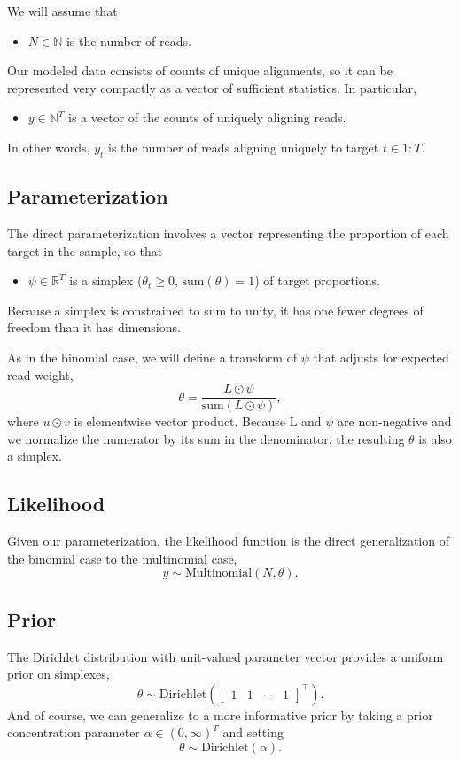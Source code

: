 \documentclass[11pt]{report}
\newcommand{\rngto}[1]{1{:}#1}
\begin{document}
We will assume that
%
\begin{itemize}
\item  $N \in \mathbb{N}$ is the number of reads.
\end{itemize}
%
Our modeled data consists of counts of unique alignments, so it can be
represented very compactly as a vector of sufficient statistics.  In
particular,
%
\begin{itemize}
\item $y \in \mathbb{N}^T$ is a vector of the counts of uniquely
  aligning reads.
\end{itemize}
%
In other words, $y_t$ is the number of reads aligning uniquely to
target $t \in \rngto{T}$.

\subsection{Parameterization}

The direct parameterization involves a vector representing the
proportion of each target in the sample, so that
%
\begin{itemize}
\item $\psi \in \mathbb{R}^T$ is a simplex ($\theta_t \geq 0$,
  $\textrm{sum}(\theta) = 1$) of target proportions.
\end{itemize}
%
Because a simplex is constrained to sum to unity, it has one fewer
degrees of freedom than it has dimensions.

As in the binomial case, we will define a transform of $\psi$ that
adjusts for expected read weight,
\[
  \theta = \frac{L \odot \psi}{\textrm{sum}(L \odot \psi)},
\]
where $u \odot v$ is elementwise vector product.  Because L and $\psi$
are non-negative and we normalize
the numerator by its sum in the denominator, the resulting $\theta$ is
also a simplex.

\subsection{Likelihood}

Given our parameterization, the likelihood function is the direct
generalization of the binomial case to the multinomial case,
\[
  y \sim \textrm{Multinomial}(N, \theta).
\]

\subsection{Prior}

The Dirichlet distribution with unit-valued parameter vector provides a
uniform prior on simplexes,
\[
  \theta \sim \textrm{Dirichlet}\left(\begin{bmatrix} 1 & 1 & \cdots &
      1 \end{bmatrix}^{\top}\right).
\]
And of course, we can generalize to a more informative prior by taking
a prior concentration parameter $\alpha \in (0, \infty)^T$ and setting
\[
  \theta \sim \textrm{Dirichlet}(\alpha).
\]
\end{document}
